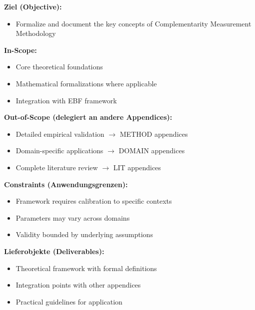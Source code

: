\begin{tcolorbox}[
    colback=orange!5!white,
    colframe=orange!75!black,
    title={\textbf{Appendix Scope: Ziel / In-Scope / Out-of-Scope / Constraints}},
    fonttitle=\bfseries
]

\textbf{Ziel (Objective):}
\begin{itemize}[nosep]
    \item Formalize and document the key concepts of Complementarity Measurement Methodology
\end{itemize}

\textbf{In-Scope:}
\begin{itemize}[nosep]
    \item Core theoretical foundations
    \item Mathematical formalizations where applicable
    \item Integration with EBF framework
\end{itemize}

\textbf{Out-of-Scope (delegiert an andere Appendices):}
\begin{itemize}[nosep]
    \item Detailed empirical validation $\rightarrow$ METHOD appendices
    \item Domain-specific applications $\rightarrow$ DOMAIN appendices
    \item Complete literature review $\rightarrow$ LIT appendices
\end{itemize}

\textbf{Constraints (Anwendungsgrenzen):}
\begin{itemize}[nosep]
    \item Framework requires calibration to specific contexts
    \item Parameters may vary across domains
    \item Validity bounded by underlying assumptions
\end{itemize}

\textbf{Lieferobjekte (Deliverables):}
\begin{itemize}[nosep]
    \item Theoretical framework with formal definitions
    \item Integration points with other appendices
    \item Practical guidelines for application
\end{itemize}

\end{tcolorbox}



